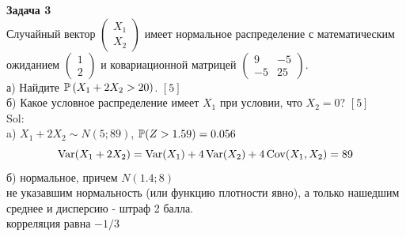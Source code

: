 \documentclass[12pt, a4paper]{article}\usepackage[]{graphicx}\usepackage[]{color}
\begin{document}
\textbf{Задача 3} \\ %
Случайный вектор  $\left(\begin{array}{c}
{X_{1} } \\ {X_{2} }
\end{array}\right)$  имеет нормальное распределение с
математическим ожиданием  $\left(\begin{array}{c} {1} \\ {2}
\end{array}\right)$  и ковариационной матрицей
$\left(\begin{array}{cc} {9} & {-5} \\ {-5} & {25}
\end{array}\right)$. \\
а) Найдите  $\P\left(X_{1} +2X_{2} >20\right)$. $[5]$ \\
б) Какое условное распределение имеет $X_{1}$ при условии, что $X_{2}=0$? $[5]$ \\
Sol: \\
a) $X_{1}+2X_{2}\sim N(5;89)$, $\P(Z>1.59)=0.056$
\[
\Var(X_1+2X_2)=\Var(X_1)+4\Var(X_2)+4\Cov(X_1,X_2)=89
\]
б) нормальное, причем $N(1.4;8)$ \\
не указавшим нормальность (или функцию плотности явно), а только нашедшим среднее и дисперсию - штраф 2 балла. \\
корреляция равна $-1/3$ \\




\end{document}
